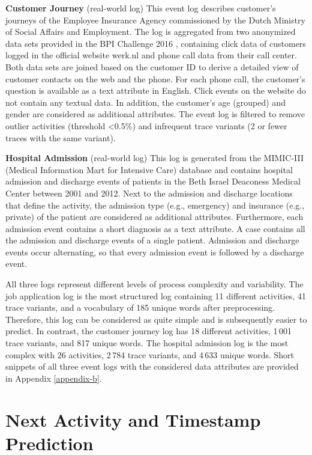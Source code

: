 \textbf{Customer Journey} (real-world log) This event log describes customer's journeys of the Employee Insurance Agency commissioned by the Dutch Ministry of Social Affairs and Employment.
The log is aggregated from two anonymized data sets provided in the BPI Challenge 2016 \cite{bpichallenge2016}, containing click data of customers logged in the official website werk.nl and phone call data from their call center.
Both data sets are joined based on the customer ID to derive a detailed view of customer contacts on the web and the phone.
For each phone call, the customer’s question is available as a text attribute in English.
Click events on the website do not contain any textual data.
In addition, the customer’s age (grouped) and gender are considered as additional attributes.
The event log is filtered to remove outlier activities (threshold <0.5\%) and infrequent trace variants (2 or fewer traces with the same variant).

\textbf{Hospital Admission} (real-world log) This log is generated from the MIMIC-III (Medical Information Mart for Intensive Care) database \cite{johnson2016mimic} and contains hospital admission and discharge events of patients in the Beth Israel Deaconess Medical Center between 2001 and 2012.
Next to the admission and discharge locations that define the activity, the admission type (e.g., emergency) and insurance (e.g., private) of the patient are considered as additional attributes.
Furthermore, each admission event contains a short diagnosis as a text attribute.
A case contains all the admission and discharge events of a single patient.
Admission and discharge events occur alternating, so that every admission event is followed by a discharge event.

All three logs represent different levels of process complexity and variability.
The job application log is the most structured log containing 11 different activities, 41 trace variants, and a vocabulary of 185 unique words after preprocessing.
Therefore, this log can be considered as quite simple and is subsequently easier to predict.
In contrast, the customer journey log has 18 different activities, 1\,001 trace variants, and 817 unique words.
The hospital admission log is the most complex with 26 activities, 2\,784 trace variants, and 4\,633 unique words.
Short snippets of all three event logs with the considered data attributes are provided in Appendix \ref{appendix-b}.

\section{Next Activity and Timestamp Prediction}

